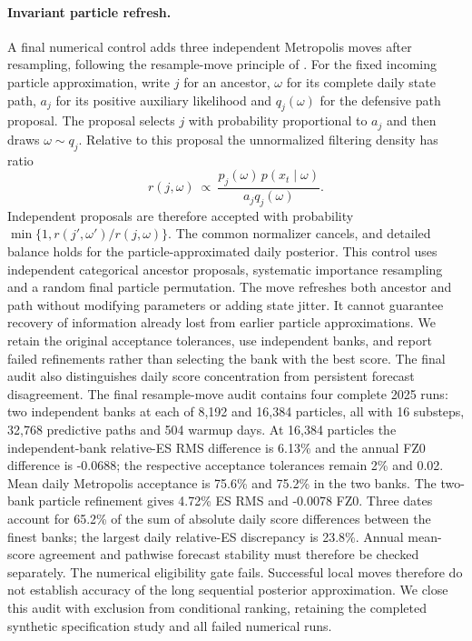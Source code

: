\documentclass[11pt]{article}
\theoremstyle{definition}\newtheorem{definition}[theorem]{Definition}
\theoremstyle{remark}\newtheorem{remark}[theorem]{Remark}
\begin{document}
\paragraph{Invariant particle refresh.}
A final numerical control adds three independent Metropolis moves after resampling, following the resample-move principle of \citet{gilks2001moving}. For the fixed incoming particle approximation, write $j$ for an ancestor, $\omega$ for its complete daily state path, $a_j$ for its positive auxiliary likelihood and $q_j(\omega)$ for the defensive path proposal. The proposal selects $j$ with probability proportional to $a_j$ and then draws $\omega\sim q_j$. Relative to this proposal the unnormalized filtering density has ratio
\[
 r(j,\omega)\ \propto\ \frac{p_j(\omega)\,p(x_t\mid\omega)}{a_j q_j(\omega)}.
\]
Independent proposals are therefore accepted with probability $\min\{1,r(j',\omega')/r(j,\omega)\}$. The common normalizer cancels, and detailed balance holds for the particle-approximated daily posterior. This control uses independent categorical ancestor proposals, systematic importance resampling and a random final particle permutation. The move refreshes both ancestor and path without modifying parameters or adding state jitter. It cannot guarantee recovery of information already lost from earlier particle approximations. We retain the original acceptance tolerances, use independent banks, and report failed refinements rather than selecting the bank with the best score. The final audit also distinguishes daily score concentration from persistent forecast disagreement.
The final resample-move audit contains four complete 2025 runs: two independent banks at each of 8,192 and 16,384 particles, all with 16 substeps, 32,768 predictive paths and 504 warmup days. At 16,384 particles the independent-bank relative-ES RMS difference is 6.13\% and the annual FZ0 difference is -0.0688; the respective acceptance tolerances remain 2\% and 0.02. Mean daily Metropolis acceptance is 75.6\% and 75.2\% in the two banks. The two-bank particle refinement gives 4.72\% ES RMS and -0.0078 FZ0. Three dates account for 65.2\% of the sum of absolute daily score differences between the finest banks; the largest daily relative-ES discrepancy is 23.8\%. Annual mean-score agreement and pathwise forecast stability must therefore be checked separately. The numerical eligibility gate fails. Successful local moves therefore do not establish accuracy of the long sequential posterior approximation. We close this audit with exclusion from conditional ranking, retaining the completed synthetic specification study and all failed numerical runs.
\end{document}
